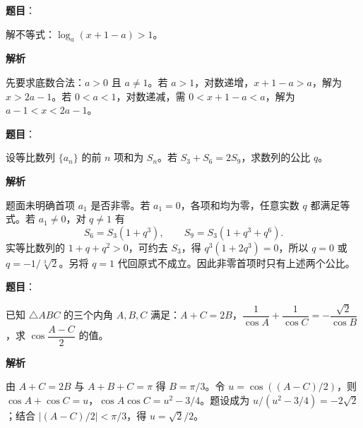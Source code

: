 \begin{answer}

\textbf{题目}：

解不等式：$\log_a(x+1-a)>1$。

\textbf{解析}

先要求底数合法：$a>0$ 且 $a\ne1$。若 $a>1$，对数递增，$x+1-a>a$，解为 $x>2a-1$。若 $0<a<1$，对数递减，需 $0<x+1-a<a$，解为 $a-1<x<2a-1$。


\end{answer}
\begin{answer}

\textbf{题目}：

设等比数列 $\{a_n\}$ 的前 $n$ 项和为 $S_n$。若 $S_3+S_6=2S_9$，求数列的公比 $q$。

\textbf{解析}

题面未明确首项 $a_1$ 是否非零。若 $a_1=0$，各项和均为零，任意实数 $q$ 都满足等式。若 $a_1\ne0$，对 $q\ne1$ 有
\nopagebreak[4]
\[
S_6=S_3(1+q^3),\qquad S_9=S_3(1+q^3+q^6).
\]
实等比数列的 $1+q+q^2>0$，可约去 $S_3$，得 $q^3(1+2q^3)=0$，所以 $q=0$ 或 $q=-1/\sqrt[3]{2}$。另将 $q=1$ 代回原式不成立。因此非零首项时只有上述两个公比。


\end{answer}
\begin{answer}

\textbf{题目}：

已知 $\triangle ABC$ 的三个内角 $A,B,C$ 满足：$A+C=2B$，$\dfrac{1}{\cos A}+\dfrac{1}{\cos C}=-\dfrac{\sqrt{2}}{\cos B}$，求 $\cos\dfrac{A-C}{2}$ 的值。

\textbf{解析}

由 $A+C=2B$ 与 $A+B+C=\pi$ 得 $B=\pi/3$。令 $u=\cos((A-C)/2)$，则 $\cos A+\cos C=u$，$\cos A\cos C=u^2-3/4$。题设成为 $u/(u^2-3/4)=-2\sqrt2$；结合 $| (A-C)/2 |<\pi/3$，得 $u=\sqrt2/2$。


\end{answer}
